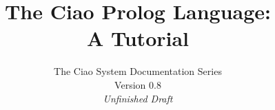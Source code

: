 \documentclass[11pt,draft]{article}
\begin{document}
\title{\bf The Ciao Prolog Language:\\ A Tutorial}
\author{The Ciao System Documentation Series\\ Version 0.8\\
  {\sl Unfinished Draft}}
\maketitle

\begin{quote}

\end{quote}
\newpage
\ \vfill
\begin{small}

\end{small}
\newpage
\tableofcontents
\newpage
\ 
\newpage

\newpage

\newpage

\newpage
\appendix


\newpage
%


\end{document}
